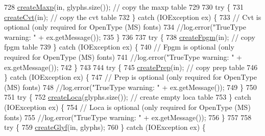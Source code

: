 \begin{DoxyCode}
728         \mbox{\hyperlink{classorg_1_1newdawn_1_1slick_1_1tools_1_1hiero_1_1truetype_1_1_t_t_f_sub_set_file_a8c4bd8885ccc2b53ee44076cea3141f1}{createMaxp}}(in, glyphs.size());    \textcolor{comment}{// copy the maxp table}
729 
730         \textcolor{keywordflow}{try} \{
731             \mbox{\hyperlink{classorg_1_1newdawn_1_1slick_1_1tools_1_1hiero_1_1truetype_1_1_t_t_f_sub_set_file_ae655faae5dece42b491744589122b1ea}{createCvt}}(in);    \textcolor{comment}{// copy the cvt table}
732         \} \textcolor{keywordflow}{catch} (IOException ex) \{
733             \textcolor{comment}{// Cvt is optional (only required for OpenType (MS) fonts)}
734             \textcolor{comment}{//log.error("TrueType warning: " + ex.getMessage());}
735         \}
736 
737         \textcolor{keywordflow}{try} \{
738             \mbox{\hyperlink{classorg_1_1newdawn_1_1slick_1_1tools_1_1hiero_1_1truetype_1_1_t_t_f_sub_set_file_aaac00529b3dc804ca7cfde3b330e0bce}{createFpgm}}(in);    \textcolor{comment}{// copy fpgm table}
739         \} \textcolor{keywordflow}{catch} (IOException ex) \{
740             \textcolor{comment}{// Fpgm is optional (only required for OpenType (MS) fonts)}
741             \textcolor{comment}{//log.error("TrueType warning: " + ex.getMessage());}
742         \}
743 
744         \textcolor{keywordflow}{try} \{
745             \mbox{\hyperlink{classorg_1_1newdawn_1_1slick_1_1tools_1_1hiero_1_1truetype_1_1_t_t_f_sub_set_file_a76a697ec413ae68666ea0792fac1aa12}{createPrep}}(in);    \textcolor{comment}{// copy prep table}
746         \} \textcolor{keywordflow}{catch} (IOException ex) \{
747             \textcolor{comment}{// Prep is optional (only required for OpenType (MS) fonts)}
748             \textcolor{comment}{//log.error("TrueType warning: " + ex.getMessage());}
749         \}
750 
751         \textcolor{keywordflow}{try} \{
752             \mbox{\hyperlink{classorg_1_1newdawn_1_1slick_1_1tools_1_1hiero_1_1truetype_1_1_t_t_f_sub_set_file_af01c5f651caad08d431324bc69b388c9}{createLoca}}(glyphs.size());    \textcolor{comment}{// create empty loca table}
753         \} \textcolor{keywordflow}{catch} (IOException ex) \{
754             \textcolor{comment}{// Loca is optional (only required for OpenType (MS) fonts)}
755             \textcolor{comment}{//log.error("TrueType warning: " + ex.getMessage());}
756         \}
757 
758         \textcolor{keywordflow}{try} \{
759             \mbox{\hyperlink{classorg_1_1newdawn_1_1slick_1_1tools_1_1hiero_1_1truetype_1_1_t_t_f_sub_set_file_a2b576b795892e003c04787ffc1f7262a}{createGlyf}}(in, glyphs);
760         \} \textcolor{keywordflow}{catch} (IOException ex) \{

\end{DoxyCode}
